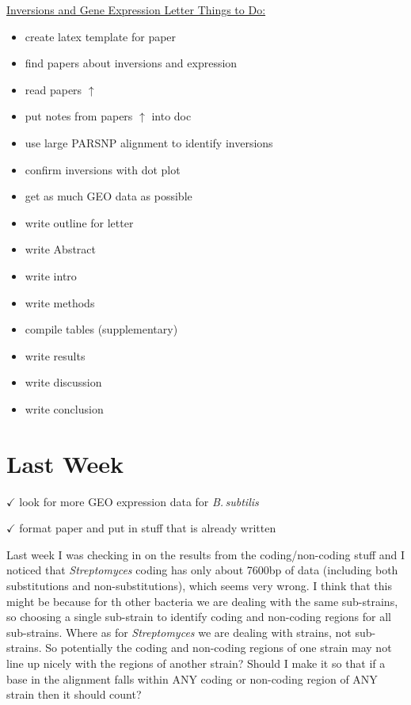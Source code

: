 \documentclass[12pt]{article}
\newcommand{\strep}{\textit{Streptomyces}\xspace}
\newcommand{\bass}{\textit{B.\,subtilis}\xspace}
\begin{document}
\underline{Inversions and Gene Expression Letter Things to Do:}
\begin{itemize}
	\item create latex template for paper
	\item find papers about inversions and expression
	\item read papers $\uparrow$
	\item put notes from papers $\uparrow$ into doc
	\item use large PARSNP alignment to identify inversions
	\item confirm inversions with dot plot
	\item get as much GEO data as possible
	\item write outline for letter
	\item write Abstract
	\item write intro
	\item write methods
	\item compile tables (supplementary)
	\item write results
	\item write discussion
	\item write conclusion 
\end{itemize}




	
\section*{Last Week}

$\checkmark$ look for more GEO expression data for \bass

$\checkmark$ format paper and put in stuff that is already written

Last week I was checking in on the results from the coding/non-coding stuff and I noticed that \strep coding has only about 7600bp of data (including both substitutions and non-substitutions), which seems very wrong.
I think that this might be because for th other bacteria we are dealing with the same sub-strains, so choosing a single sub-strain to identify coding and non-coding regions for all sub-strains.
Where as for \strep we are dealing with strains, not sub-strains. So potentially the coding and non-coding regions of one strain may not line up nicely with the regions of another strain?
Should I make it so that if a base in the alignment falls within ANY coding or non-coding region of ANY strain then it should count?
\end{document}
